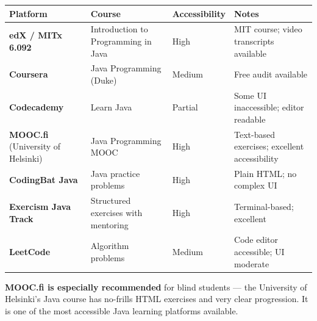 \documentclass[
  justified,
  openright,
]{tufte-book}
\begin{document}
\begin{fullwidth}{\def\LTcaptype{none} %
\begin{longtable}[]{@{}
  >{\raggedright\arraybackslash}p{}
  >{\raggedright\arraybackslash}p{}
  >{\raggedright\arraybackslash}p{}
  >{\raggedright\arraybackslash}p{}@{}}
\toprule\noalign{}
\begin{minipage}[b]{\linewidth}\raggedright
Platform
\end{minipage} & \begin{minipage}[b]{\linewidth}\raggedright
Course
\end{minipage} & \begin{minipage}[b]{\linewidth}\raggedright
Accessibility
\end{minipage} & \begin{minipage}[b]{\linewidth}\raggedright
Notes
\end{minipage} \\
\midrule\noalign{}
\endhead
\bottomrule\noalign{}
\endlastfoot
\textbf{edX / MITx 6.092} & Introduction to Programming in Java & High &
MIT course; video transcripts available \\
\textbf{Coursera} & Java Programming (Duke) & Medium & Free audit
available \\
\textbf{Codecademy} & Learn Java & Partial & Some UI inaccessible;
editor readable \\
\textbf{MOOC.fi} (University of Helsinki) & Java Programming MOOC & High
& Text-based exercises; excellent accessibility \\
\textbf{CodingBat Java} & Java practice problems & High & Plain HTML; no
complex UI \\
\textbf{Exercism Java Track} & Structured exercises with mentoring &
High & Terminal-based; excellent \\
\textbf{LeetCode} & Algorithm problems & Medium & Code editor
accessible; UI moderate \\
\end{longtable}
}
\end{fullwidth}

\textbf{MOOC.fi is especially recommended} for blind students --- the
University of Helsinki's Java course has no-frills HTML exercises and
very clear progression. It is one of the most accessible Java learning
platforms available.
\end{document}
